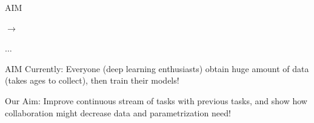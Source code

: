 \documentclass[aspectratio=169]{beamer}
\begin{document}
\begin{frame}{AIM}
  \begin{minipage}{0.45\textwidth}
  \end{minipage}%
  $\to$ \begin{minipage}{0.45\textwidth} 
  \end{minipage} $\dots$
\end{frame}

\begin{frame}{AIM}
  \centering
  \color{Pink} Currently:  \color{Black} Everyone (deep learning enthusiasts) obtain huge amount of data (takes ages to collect), then train their models!

  \color{Pink} Our Aim: \color{Black} Improve continuous stream of tasks  with previous tasks, and show how collaboration might decrease data and parametrization need! 
\end{frame}
\end{document}
